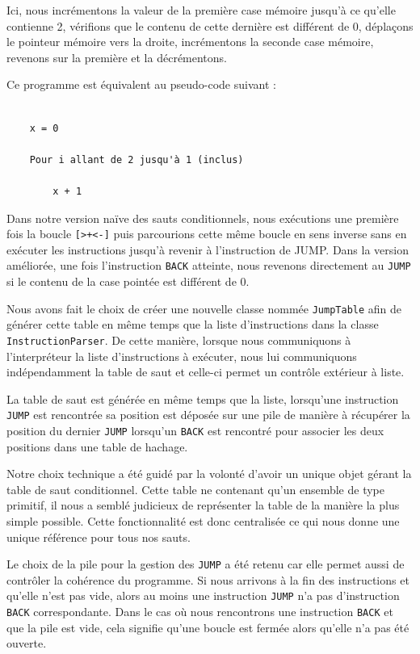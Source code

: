 \documentclass{article}
\begin{document}
    Ici, nous incrémentons la valeur de la première case mémoire jusqu'à ce qu'elle contienne 2, vérifions que le contenu de cette dernière est différent de 0, déplaçons le pointeur mémoire vers la droite, incrémentons la seconde case mémoire, revenons sur la première et la décrémentons.


    Ce programme est équivalent au pseudo-code suivant :

 \begin{verbatim}   

    x = 0

    Pour i allant de 2 jusqu'à 1 (inclus)

        x + 1

\end{verbatim}



    Dans notre version naïve des sauts conditionnels, nous exécutions une première fois la boucle \texttt{[>+<-]} puis parcourions cette même boucle en sens inverse sans en exécuter les instructions jusqu'à revenir à l'instruction de JUMP. Dans la version améliorée, une fois l'instruction \texttt{BACK} atteinte, nous revenons directement au \texttt{JUMP} si le contenu de la case pointée est différent de 0.


    Nous avons fait le choix de créer une nouvelle classe nommée \texttt{JumpTable} afin de générer cette table en même temps que la liste d'instructions dans la classe \texttt{InstructionParser}. De cette manière, lorsque nous communiquons à l'interpréteur la liste d'instructions à exécuter, nous lui communiquons indépendamment la table de saut et celle-ci permet un contrôle extérieur à liste.


    La table de saut est générée en même temps que la liste, lorsqu'une instruction \texttt{JUMP} est rencontrée sa position est déposée sur une pile de manière à récupérer la position du dernier \texttt{JUMP} lorsqu'un \texttt{BACK} est rencontré pour associer les deux positions dans une table de hachage.



    Notre choix technique a été guidé par la volonté d'avoir un unique objet gérant la table de saut conditionnel. Cette table ne contenant qu'un ensemble de type primitif, il nous a semblé judicieux de représenter la table de la manière la plus simple possible. Cette fonctionnalité est donc centralisée ce qui nous donne une unique référence pour tous nos sauts.


    Le choix de la pile pour la gestion des \texttt{JUMP} a été retenu car elle permet aussi de contrôler la cohérence du programme. Si nous arrivons à la fin des instructions et qu'elle n'est pas vide, alors au moins une instruction \texttt{JUMP} n'a pas d'instruction \texttt{BACK} correspondante. Dans le cas où nous rencontrons une instruction \texttt{BACK} et que la pile est vide, cela signifie qu'une boucle est fermée alors qu'elle n'a pas été ouverte.
\end{document}
